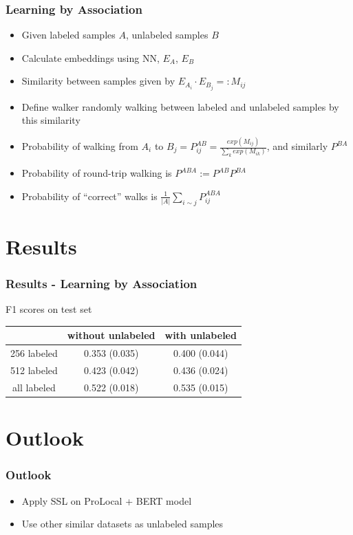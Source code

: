 \documentclass{beamer}
\begin{document}
\begin{frame}
\frametitle{Learning by Association}
\begin{itemize}
\item Given labeled samples $A$, unlabeled samples $B$
\item Calculate embeddings using NN, $E_A$, $E_B$
\item Similarity between samples given by $E_{A_i} \cdot E_{B_j} =: M_{ij}$
\item Define walker randomly walking between labeled and unlabeled samples by this similarity
\item Probability of walking from $A_i$ to $B_j = P^{AB}_{ij} = \frac{exp(M_{ij})}{\sum_k exp(M_{ik})}$, and similarly $P^{BA}$
\item Probability of round-trip walking is $P^{ABA} := P^{AB}P^{BA}$
\item Probability of ``correct'' walks is $\frac{1}{|A|}\sum_{i \sim j}P^{ABA}_{ij}$ 
\end{itemize}
\end{frame}

\section{Results}
\begin{frame}
\frametitle{Results - Learning by Association}
F1 scores on test set
\begin{center}
\begin{tabular}{|c|c|c|}
	\hline
	 & without unlabeled & with unlabeled\\
	\hline
	256 labeled & 0.353 (0.035) & 0.400 (0.044) \\
	512 labeled & 0.423 (0.042) & 0.436 (0.024) \\
	all labeled & 0.522 (0.018) & 0.535 (0.015) \\
	\hline
\end{tabular}
\end{center}
\end{frame}

\section{Outlook}
\begin{frame}
\frametitle{Outlook}
\begin{itemize}
\item Apply SSL on ProLocal + BERT model
\item Use other similar datasets as unlabeled samples
\end{itemize}
\end{frame}
\end{document}
